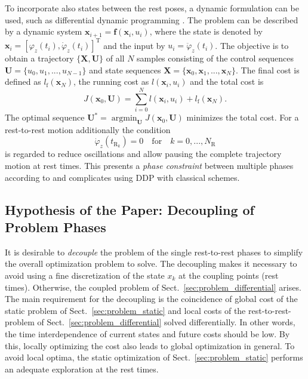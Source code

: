 \documentclass[runningheads]{llncs}
\newcommand{\bm}[1]{\boldsymbol{#1}}
\renewcommand{\vec}[1]{\boldsymbol{#1}}
\DeclareMathOperator*{\argmin}{argmin}
\newcommand{\transp}[0]{{\mathrm{T}}}
\begin{document}
To incorporate also states between the rest poses, a dynamic formulation can be used, such as differential dynamic programming \cite{TassaManTod2014}.
The problem can be described by a dynamic system $\vec{x}_{i+1}{=}\bm{f}(\vec{x}_{i},u_i)$,
where the state is denoted by $\vec{x}_i {=} [\varphi_z (t_i),\dot{\varphi}_z (t_i)]^\transp$ and the input by $u_i {=} \ddot{\varphi}_z (t_i)$.
%
The objective is to obtain a trajectory $\{\vec{X},\vec{U}\}$ of all $N$ samples consisting of the control sequences $\vec{U}{=}\{u_0,u_1,...,u_{N-1}\}$ and state sequences $\vec{X}{=}\{\vec{x}_0, \vec{x}_1, ..., \vec{x}_N\}$.
%
The final cost is defined as $l_\mathrm{f}(\vec{x}_N)$, the running cost as $l(\vec{x}_i, u_i)$ and the total cost is
\begin{equation}
J(\vec{x}_0,\vec{U}) = \sum_{i=0}^{N} l(\vec{x}_i,u_i)+l_\mathrm{f}(\vec{x}_N).
\end{equation}
%
The optimal sequence $\vec{U}^*=\argmin_{\vec{U}}{J(\vec{x}_0,\vec{U})}$ minimizes the total cost.
For a rest-to-rest motion additionally the condition %
\begin{equation}
\dot{\varphi}_z(t_{\mathrm{R}_k})=0 
\quad \mathrm{for} \quad
k = 0,...,N_\mathrm{R}
\end{equation}
%
is regarded to reduce oscillations and allow pausing the complete trajectory motion at rest times.
This presents a \emph{phase constraint} between multiple phases according to \cite{LantoineRus2012} and complicates using DDP with classical schemes.


\subsection{Hypothesis of the Paper: Decoupling of Problem Phases}
\label{sec:problem_hypothesis}

It is desirable to \emph{decouple} the problem of the single rest-to-rest phases to simplify the overall optimization problem to solve.
The decoupling makes it necessary to avoid using a fine discretization of the state $x_k$ at the coupling points (rest times).
Otherwise, the coupled problem of Sect.~\ref{sec:problem_differential} arises.
The main requirement for the decoupling is the coincidence of global cost of the static problem of Sect.~\ref{sec:problem_static} and local costs of the rest-to-rest-problem of Sect.~\ref{sec:problem_differential} solved differentially.
In other words, the time interdependence of current states and future costs should be low.
By this, locally optimizing the cost also leads to global optimization in general.
To avoid local optima, the static optimization of Sect.~\ref{sec:problem_static} performs an adequate exploration at the rest times.
\end{document}
